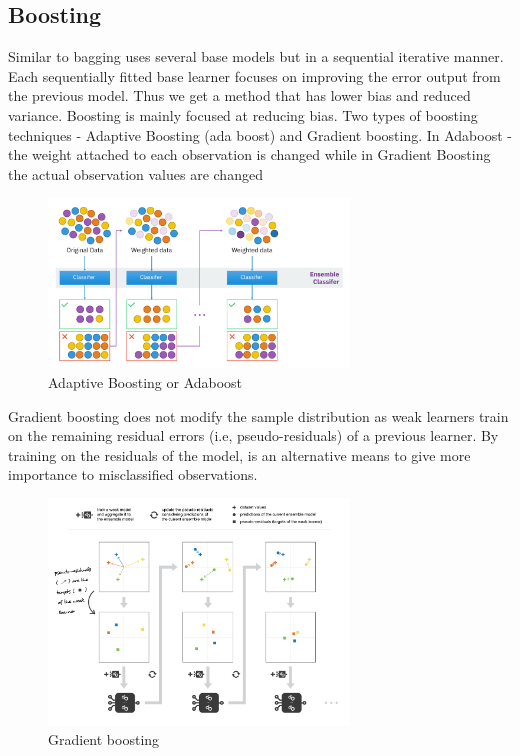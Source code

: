 \documentclass{article}
\begin{document}
\subsection{Boosting}


Similar to bagging uses several base models but in a sequential iterative manner. Each sequentially fitted base learner focuses on improving the error output from the previous model. Thus we get a method that has lower bias and reduced variance.
Boosting is mainly focused at reducing bias. Two types of boosting techniques - Adaptive Boosting (ada boost) and Gradient boosting.
In Adaboost - the weight attached to each observation is changed while in Gradient Boosting the actual observation values are changed

\begin{figure}[H]
    \centering
    \includegraphics[width=8cm]{report-imgs/adaboost.png}
    \caption{Adaptive Boosting or Adaboost}
    \label{adaboost}
\end{figure}

Gradient boosting does not modify the sample distribution as weak learners train on the remaining residual errors  (i.e, pseudo-residuals) of a previous learner. By training on the residuals of the model, is an alternative means to give more importance to misclassified observations.


\begin{figure}[H]
    \centering
    \includegraphics[width=8cm]{report-imgs/gradientboost.png}
    \caption{Gradient boosting}
    \label{gradientboost}
\end{figure}
\end{document}
